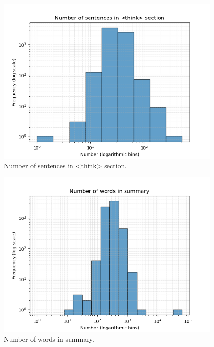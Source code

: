 \begin{figure}[htbp]
\centerline{\includegraphics[width=\linewidth]{"./Number of sentences in <think> section.png"}}
\caption{Number of sentences in <think> section.}
\label{fig}
\end{figure}


\begin{figure}[htbp]
\centerline{\includegraphics[width=\linewidth]{"./Number of words in summary.png"}}
\caption{Number of words in summary.}
\label{fig}
\end{figure}


